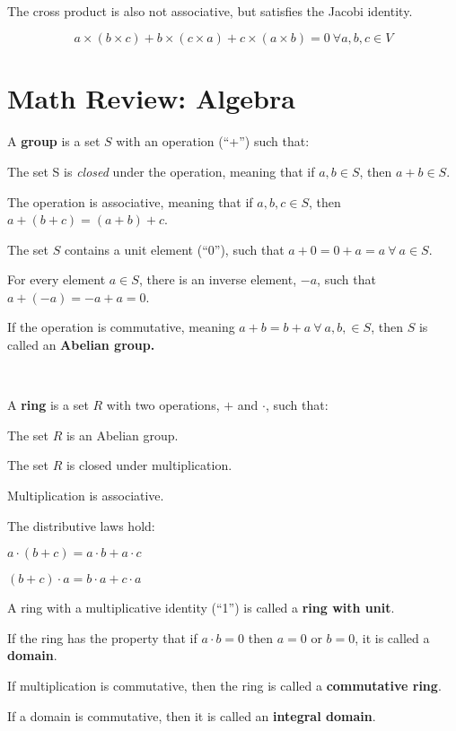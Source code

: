 \documentclass[12pt]{article}
\begin{document}
\begin{spacing}{1.2}
\

The cross product is also not associative, but satisfies the Jacobi identity.

$$a \times (b \times c) + b \times (c \times a) + c \times (a \times b) = 0 \ \forall a, b, c \in V$$

\section{Math Review:  Algebra}

A {\bf group} is a set $S$ with an operation (``+'')  such that:

\qquad The set S is {\it closed} under the operation, meaning that if $a,b \in S$, then $a+b \in S$.

\qquad The operation is associative, meaning that if $a,b,c \in S$, then $a+(b+c) = (a+b)+c$.

\qquad The set $S$ contains a unit element (``0''), such that $a+0 = 0+a = a \ \forall \ a \in S.$

\qquad For every element $a \in S$, there is an inverse element, $-a$, such that $a+(-a) = -a + a = 0$.

If the operation is commutative, meaning $a+b = b+a \ \forall \ a, b, \in S$, then $S$ is called an {\bf Abelian group.}

\

A {\bf ring} is a set $R$ with two operations, $+$ and $\cdot$, such that:

\qquad The set $R$ is an Abelian group.  

\qquad The set $R$ is closed under multiplication.

\qquad Multiplication is associative.  

\qquad The distributive laws hold:

\qquad \qquad $a \cdot (b+c) = a \cdot b + a \cdot c$

\qquad \qquad $(b+c) \cdot a = b \cdot a + c \cdot a$

A ring with a multiplicative identity (``1'') is called a {\bf ring with unit}.

If the ring has the property that if $a\cdot b = 0$ then $a=0$ or $b=0$, it is called a {\bf domain}.

If multiplication is commutative, then the ring is called a {\bf commutative ring}.

If a domain is commutative, then it is called an {\bf integral domain}.

\


\end{spacing}
\end{document}
